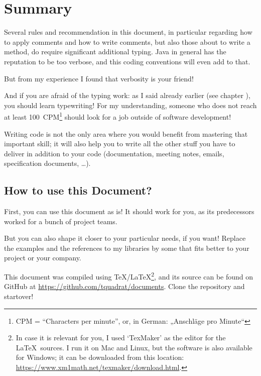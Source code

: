\chapter{Summary}
Several rules and recommendation in this document, in particular regarding how to apply comments and how to write comments, but also those about to write a method, do require significant additional typing. Java in general has the reputation to be too verbose, and this coding conventions will even add to that.

But from my experience I found that verbosity is your friend!

And if you are afraid of the typing work: as I said already earlier (see chapter ), you should learn typewriting! For my understanding, someone who does not reach at least 100~CPM\footnote{CPM = “Characters per minute”, or, in German: „Anschläge pro Minute“} should look for a job outside of software development!

Writing code is not the only area where you would benefit from mastering that important skill; it will also help you to write all the other stuff you have to deliver in addition to your code (documentation, meeting notes, emails, specification documents, …).

\section{How to use this Document?}
First, you can use this document as is! It should work for you, as its predecessors worked for a bunch of project teams.

But you can also shape it closer to your particular needs, if you want! Replace the examples and the references to my libraries by some that fits better to your project or your company.

This document was compiled using \TeX/\LaTeX\footnote{In case it is relevant for you, I used ‘TexMaker’ as the editor for the \LaTeX~sources. I run it on Mac and Linux, but the software is also available for Windows; it can be downloaded from this location: \href{https://www.xm1math.net/texmaker/download.html}{https://www.xm1math.net/texmaker/download.html}.}, and its source can be found on GitHub at \href{https://github.com/tquadrat/documents}{https://github.com/tquadrat/documents}. Clone the repository and startover!
